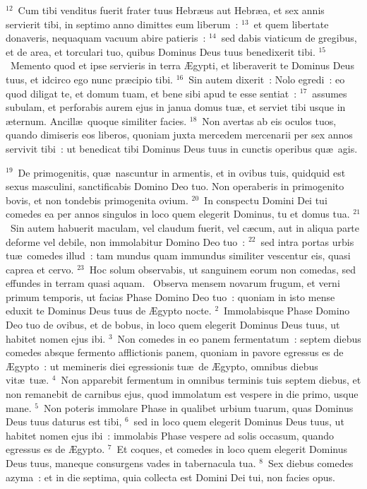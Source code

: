 ${}^{12}$~Cum tibi venditus fuerit frater tuus Hebr\ae us aut Hebr\ae a, et sex annis servierit tibi, in septimo anno dimittes eum liberum~:
${}^{13}$~et quem libertate donaveris, nequaquam vacuum abire patieris~:
${}^{14}$~sed dabis viaticum de gregibus, et de area, et torculari tuo, quibus Dominus Deus tuus benedixerit tibi.
${}^{15}$~Memento quod et ipse servieris in terra \AE gypti, et liberaverit te Dominus Deus tuus, et idcirco ego nunc pr\ae cipio tibi.
${}^{16}$~Sin autem dixerit~: Nolo egredi~: eo quod diligat te, et domum tuam, et bene sibi apud te esse sentiat~:
${}^{17}$~assumes subulam, et perforabis aurem ejus in janua domus tu\ae , et serviet tibi usque in \ae ternum. Ancill\ae\ quoque similiter facies.
${}^{18}$~Non avertas ab eis oculos tuos, quando dimiseris eos liberos, quoniam juxta mercedem mercenarii per sex annos servivit tibi~: ut benedicat tibi Dominus Deus tuus in cunctis operibus qu\ae\ agis.


${}^{19}$~De primogenitis, qu\ae\ nascuntur in armentis, et in ovibus tuis, quidquid est sexus masculini, sanctificabis Domino Deo tuo. Non operaberis in primogenito bovis, et non tondebis primogenita ovium.
${}^{20}$~In conspectu Domini Dei tui comedes ea per annos singulos in loco quem elegerit Dominus, tu et domus tua.
${}^{21}$~Sin autem habuerit maculam, vel claudum fuerit, vel c\ae cum, aut in aliqua parte deforme vel debile, non immolabitur Domino Deo tuo~:
${}^{22}$~sed intra portas urbis tu\ae\ comedes illud~: tam mundus quam immundus similiter vescentur eis, quasi caprea et cervo.
${}^{23}$~Hoc solum observabis, ut sanguinem eorum non comedas, sed effundes in terram quasi aquam.
~Observa mensem novarum frugum, et verni primum temporis, ut facias Phase Domino Deo tuo~: quoniam in isto mense eduxit te Dominus Deus tuus de \AE gypto nocte.
${}^{2}$~Immolabisque Phase Domino Deo tuo de ovibus, et de bobus, in loco quem elegerit Dominus Deus tuus, ut habitet nomen ejus ibi.
${}^{3}$~Non comedes in eo panem fermentatum~: septem diebus comedes absque fermento afflictionis panem, quoniam in pavore egressus es de \AE gypto~: ut memineris diei egressionis tu\ae\ de \AE gypto, omnibus diebus vit\ae\ tu\ae .
${}^{4}$~Non apparebit fermentum in omnibus terminis tuis septem diebus, et non remanebit de carnibus ejus, quod immolatum est vespere in die primo, usque mane.
${}^{5}$~Non poteris immolare Phase in qualibet urbium tuarum, quas Dominus Deus tuus daturus est tibi,
${}^{6}$~sed in loco quem elegerit Dominus Deus tuus, ut habitet nomen ejus ibi~: immolabis Phase vespere ad solis occasum, quando egressus es de \AE gypto.
${}^{7}$~Et coques, et comedes in loco quem elegerit Dominus Deus tuus, maneque consurgens vades in tabernacula tua.
${}^{8}$~Sex diebus comedes azyma~: et in die septima, quia collecta est Domini Dei tui, non facies opus.


